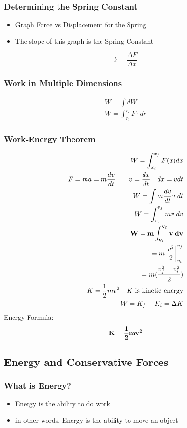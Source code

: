 \documentclass[../Notes.tex]{subfiles}
\begin{document}
\subsubsection{Determining the Spring Constant}
\begin{itemize}
	\item Graph Force vs Displacement for the Spring
	\item The slope of this graph is the Spring Constant
\end{itemize}
\begin{equation*}
k = \frac{\Delta F}{\Delta x}
\end{equation*}

\subsubsection{Work in Multiple Dimensions}
\begin{align*}
W = \int dW \\
W = \int_{r_1}^{r_2} F \cdot dr 
\end{align*}

\subsubsection{Work-Energy Theorem}
\begin{align*}
W = \int_{x_i}^{x_f} F(x) dx \\
F = ma = m \frac{dv}{dt} \qquad v = \frac{dx}{dt} \quad dx = vdt \\
W = \int m \frac{dv}{dt} v \; dt \\
W = \int_{v_i}^{v_f} m v \; dv  \\
{\bf W = m \int_{v_i}^{v_f} v \; dv} \\
= m \left. \frac{v^2}{2} \right|_{v_i}^{v_f} \\
= m (\frac{v_f^2 - v_i^2}{2}) \\
K = \frac12 mv^2 \quad \text{$K$ is kinetic energy} \\
W = K_f - K_i = \Delta K
\end{align*}
Energy Formula:
\begin{equation*}
	{\bf K = \frac{1}{2} mv^2}
\end{equation*}

\subsection{Energy and Conservative Forces}

\subsubsection{What is Energy?}
\begin{itemize}
	\item Energy is the ability to do work
	\item in other words, Energy is the ability to move an object
\end{itemize}
\end{document}
